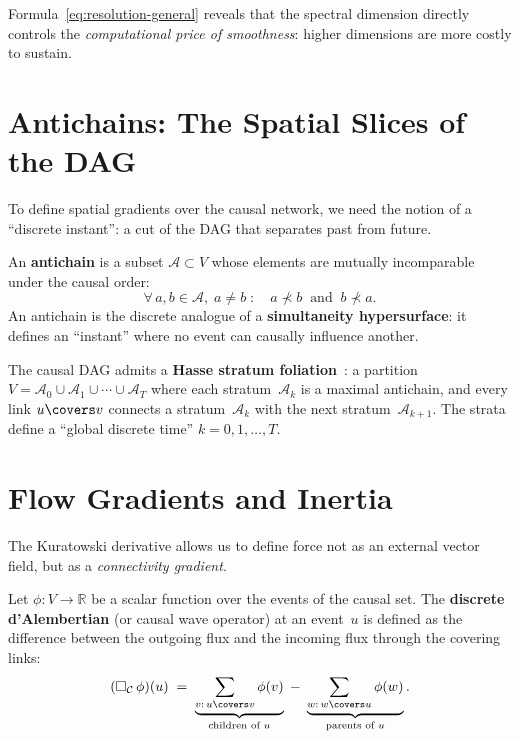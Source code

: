 \noindent
Formula~\eqref{eq:resolution-general} reveals that the
spectral dimension directly controls the
\emph{computational price of smoothness}: higher dimensions
are more costly to sustain.

\section{Antichains: The Spatial Slices of the DAG}

To define spatial gradients over the causal network, we need
the notion of a ``discrete instant'': a cut of the DAG that separates
past from future.

\begin{definition}[Antichain]
\label{def:antichain}
An \textbf{antichain} is a subset $\mathcal{A} \subset V$
whose elements are mutually incomparable under the causal order:
\[
  \forall\, a, b \in \mathcal{A},\;a \neq b
  \;\colon\quad
  a \nprec b \;\;\text{and}\;\; b \nprec a.
\]
An antichain is the discrete analogue of a
\textbf{simultaneity hypersurface}: it defines an ``instant''
where no event can causally influence another.
\end{definition}

\noindent
The causal DAG admits a \textbf{Hasse stratum
foliation}~\cite{rideout2000,surya2019}: a partition
$V = \mathcal{A}_0 \cup \mathcal{A}_1 \cup \cdots \cup
\mathcal{A}_T$ where each stratum~$\mathcal{A}_k$ is a maximal
antichain, and every link $u \covers v$ connects a
stratum~$\mathcal{A}_k$ with the next stratum~$\mathcal{A}_{k+1}$.
The strata define a ``global discrete time'' $k = 0, 1,
\ldots, T$.

\section{Flow Gradients and Inertia}

The Kuratowski derivative allows us to define force not as an
external vector field, but as a \emph{connectivity
gradient}.

\begin{definition}
\label{def:box-operator}
Let $\phi \colon V \to \mathbb{R}$ be a scalar function over the
events of the causal set. The \textbf{discrete d'Alembertian}
(or causal wave operator) at an event~$u$ is defined as the
difference between the outgoing flux and the incoming flux through
the covering links:
\begin{equation}
  (\Box_{\mathcal{C}}\,\phi)(u)
  \;=\;
  \underbrace{\sum_{v :\, u \covers v} \phi(v)}_{\text{children of } u}
  \;-\;
  \underbrace{\sum_{w :\, w \covers u} \phi(w)}_{\text{parents of } u}.
  \label{eq:box-discrete}
\end{equation}
\end{definition}

